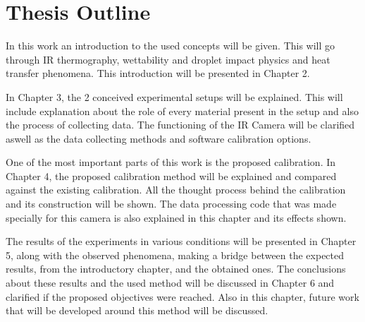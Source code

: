 \section{Thesis Outline}
\label{sec:int_outline}

\par In this work an introduction to the used concepts will be given. This will go through IR thermography, wettability and droplet impact physics and heat transfer phenomena. This introduction will be presented in Chapter 2.\\

\par In Chapter 3, the 2 conceived experimental setups will be explained. This will include explanation about the role of every material present in the setup and also the process of collecting data. The functioning of the IR Camera will be clarified aswell as the data collecting methods and software calibration options.\\

\par One of the most important parts of this work is the proposed calibration. In Chapter 4, the proposed calibration method will be explained and compared against the existing calibration. All the thought process behind the calibration and its construction will be shown. The data processing code that was made specially for this camera is also explained in this chapter and its effects shown.\\

\par The results of the experiments in various conditions will be presented in Chapter 5, along with the observed phenomena, making a bridge between the expected results, from the introductory chapter, and the obtained ones. The conclusions about these results and the used method will be discussed in Chapter 6 and clarified if the proposed objectives were reached. Also in this chapter, future work that will be developed around this method will be discussed.
